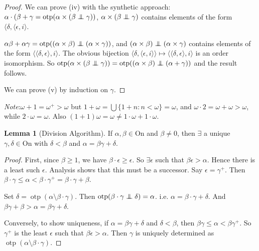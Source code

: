 \documentclass[a4paper]{article}
\theoremstyle{definition}
\newtheorem*{lemma}{Lemma}
\newcommand{\note}{\noindent \emph{Note}:\;}
\newcommand{\On}{\mathrm{On}}
\newcommand{\bra}{\langle}
\newcommand{\ket}{\rangle}
\newcommand{\oadd}{\mathrel\bot\joinrel\mspace{-8mu}\mathrel\bot}
\DeclareMathOperator\otp{otp}
\begin{document}
\begin{proof}
  We can prove (iv) with the synthetic approach: $\alpha\cdot(\beta + \gamma = \otp(\alpha\times(\beta\oadd \gamma))$, $\alpha\times (\beta\oadd\gamma)$ contains elements of the form $\bra \delta,\bra\epsilon,i\ket$.

  $\alpha\beta + \alpha\gamma = \otp((\alpha\times\beta)\oadd(\alpha\times\gamma))$, and $(\alpha\times\beta)\oadd(\alpha\times\gamma)$ contains elements of the form $\bra\bra\delta,\epsilon\ket,i\ket$. The obvious bijection $\bra \delta,\bra \epsilon,i\ket\ket\mapsto \bra\bra\delta,\epsilon\ket,i\ket$ is an order isomorphism. So $\otp(\alpha\times(\beta\oadd\gamma)) = \otp((\alpha\times\beta)\oadd(\alpha + \gamma))$ and the result follows.

  We can prove (v) by induction on $\gamma$.
\end{proof}

\note $\omega + 1 = \omega^+ > \omega$ but $1 + \omega = \bigcup\{1 + n: n < \omega\} = \omega$, and $\omega\cdot 2 = \omega + \omega > \omega$, while $2\cdot \omega = \omega$. Also $(1 + 1)\omega = \omega \not= 1\cdot \omega + 1\cdot \omega$.

\begin{lemma}[Division Algorithm]
  If $\alpha, \beta\in \On$ and $\beta\not= 0$, then $\exists$ a unique $\gamma, \delta\in \On$ with $\delta < \beta$ and $\alpha = \beta\gamma + \delta$.
\end{lemma}

\begin{proof}
  First, since $\beta \geq 1$, we have $\beta\cdot \epsilon \geq \epsilon$. So $\exists \epsilon$ such that $\beta\epsilon > \alpha$. Hence there is a least such $\epsilon$. Analysis shows that this must be a successor. Say $\epsilon = \gamma^+$. Then $\beta\cdot \gamma \leq \alpha < \beta\cdot \gamma^+ = \beta\cdot\gamma + \beta$.

Set $\delta = \otp(\alpha\setminus \beta\cdot\gamma)$. Then $\otp(\beta\cdot \gamma\oadd\delta) = \alpha$. i.e. $\alpha = \beta\cdot \gamma + \delta$. And $\beta\gamma + \beta > \alpha = \beta \gamma + \delta$.

Conversely, to show uniqueness, if $\alpha = \beta\gamma + \delta$ and $\delta < \beta$, then $\beta\gamma \leq \alpha < \beta \gamma^+$. So $\gamma^+$ is the least $\epsilon$ such that $\beta \epsilon > \alpha$. Then $\gamma$ is uniquely determined as $\otp(\alpha\setminus \beta\cdot \gamma)$.
\end{proof}
\end{document}
